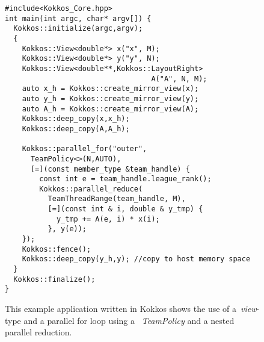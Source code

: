 \begin{figure}[t!]
\begin{small}
\begin{verbatim}
#include<Kokkos_Core.hpp>
int main(int argc, char* argv[]) {
  Kokkos::initialize(argc,argv);
  {
    Kokkos::View<double*> x("x", M);  
    Kokkos::View<double*> y("y", N);
    Kokkos::View<double**,Kokkos::LayoutRight> 
                                  A("A", N, M);  
    auto x_h = Kokkos::create_mirror_view(x);
    auto y_h = Kokkos::create_mirror_view(y);
    auto A_h = Kokkos::create_mirror_view(A);
    Kokkos::deep_copy(x,x_h);
    Kokkos::deep_copy(A,A_h);    
    
    Kokkos::parallel_for("outer", 
      TeamPolicy<>(N,AUTO),
      [=](const member_type &team_handle) {
        const int e = team_handle.league_rank();
        Kokkos::parallel_reduce( 
          TeamThreadRange(team_handle, M),
          [=](const int & i, double & y_tmp) {
            y_tmp += A(e, i) * x(i);
          }, y(e));
    }); 
    Kokkos::fence();
    Kokkos::deep_copy(y_h,y); //copy to host memory space    
  }
  Kokkos::finalize();
}
\end{verbatim}
\end{small}
\caption{This example application written in Kokkos shows the use of a~\emph{view}-type and a parallel for loop using a ~\emph{TeamPolicy} and a nested parallel reduction. }
\label{fig:KokkosExample}
\end{figure}

